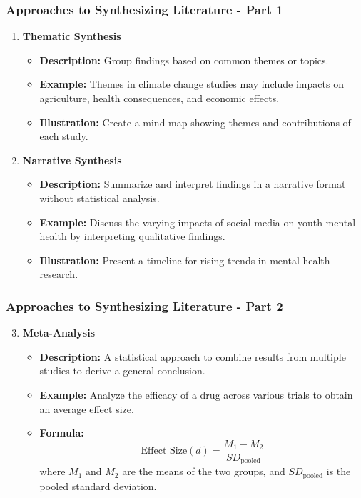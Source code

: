 \documentclass[aspectratio=169]{beamer}
\begin{document}
\begin{frame}[fragile]
    \frametitle{Approaches to Synthesizing Literature - Part 1}
    \begin{enumerate}
        \item \textbf{Thematic Synthesis}
            \begin{itemize}
                \item \textbf{Description:} Group findings based on common themes or topics.
                \item \textbf{Example:} Themes in climate change studies may include impacts on agriculture, health consequences, and economic effects.
                \item \textbf{Illustration:} Create a mind map showing themes and contributions of each study.
            \end{itemize}
        
        \item \textbf{Narrative Synthesis}
            \begin{itemize}
                \item \textbf{Description:} Summarize and interpret findings in a narrative format without statistical analysis.
                \item \textbf{Example:} Discuss the varying impacts of social media on youth mental health by interpreting qualitative findings.
                \item \textbf{Illustration:} Present a timeline for rising trends in mental health research.
            \end{itemize}
    \end{enumerate}
\end{frame}

\begin{frame}[fragile]
    \frametitle{Approaches to Synthesizing Literature - Part 2}
    \begin{enumerate}
        \setcounter{enumi}{2} %
        \item \textbf{Meta-Analysis}
            \begin{itemize}
                \item \textbf{Description:} A statistical approach to combine results from multiple studies to derive a general conclusion.
                \item \textbf{Example:} Analyze the efficacy of a drug across various trials to obtain an average effect size.
                \item \textbf{Formula:} 
                \begin{equation}
                    \text{Effect Size} (d) = \frac{M_1 - M_2}{SD_{\text{pooled}}}
                \end{equation}
                where $M_1$ and $M_2$ are the means of the two groups, and $SD_{\text{pooled}}$ is the pooled standard deviation.
            \end{itemize}
    \end{enumerate}
\end{frame}
\end{document}
